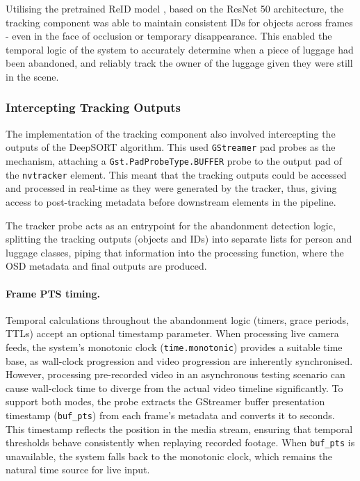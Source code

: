 Utilising the pretrained ReID model \citep{nvidia2026reidnet}, based on the
ResNet 50 architecture, the tracking component was able to maintain consistent
IDs for objects across frames - even in the face of occlusion or temporary
disappearance. This enabled the temporal logic of the system to accurately
determine when a piece of luggage had been abandoned, and reliably track the
owner of the luggage given they were still in the scene.

\subsubsection{Intercepting Tracking Outputs}

The implementation of the tracking component also involved intercepting the
outputs of the DeepSORT algorithm. This used \texttt{GStreamer} pad probes as
the mechanism, attaching a \texttt{Gst.PadProbeType.BUFFER} probe to the output
pad of the \texttt{nvtracker} element. This meant that the tracking outputs
could be accessed and processed in real-time as they were generated by the
tracker, thus, giving access to post-tracking metadata before downstream
elements in the pipeline.

The tracker probe acts as an entrypoint for the abandonment detection logic,
splitting the tracking outputs (objects and IDs) into separate lists for person
and luggage classes, piping that information into the processing function,
where the OSD metadata and final outputs are produced.

\paragraph{Frame PTS timing.}

Temporal calculations throughout the abandonment logic (timers, grace periods,
TTLs) accept an optional timestamp parameter. When processing live camera
feeds, the system's monotonic clock (\texttt{time.monotonic}) provides a
suitable time base, as wall-clock progression and video progression are
inherently synchronised. However, processing pre-recorded video in an
asynchronous testing scenario can cause wall-clock time to diverge from the
actual video timeline significantly. To support both modes, the probe extracts
the GStreamer buffer presentation timestamp (\texttt{buf\_pts}) from each
frame's metadata and converts it to seconds. This timestamp reflects the
position in the media stream, ensuring that temporal thresholds behave
consistently when replaying recorded footage. When \texttt{buf\_pts} is
unavailable, the system falls back to the monotonic clock, which remains the
natural time source for live input.

